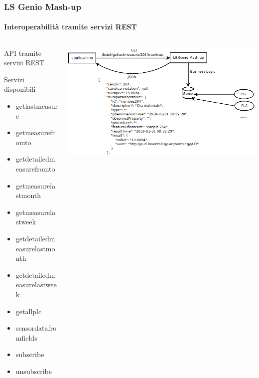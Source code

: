 \documentclass{beamer}
\begin{document}
\begin{frame}
\frametitle{LS Genio Mash-up}
\framesubtitle{Interoperabilità tramite servizi REST}
\begin{columns}[T] %
	\begin{column}{.4\textwidth}
		\begin{itemize}
			{\tiny
				\item API tramite servizi REST
				\item Servizi disponibili
				\begin{itemize}
					\tiny
					\item getlastmeasure
					\item getmeasurefromto
					\item getdetailedmeasurefromto
					\item getmeasurelastmonth
					\item getmeasurelastweek
					\item getdetailedmeasurelastmonth
					\item getdetailedmeasurelastweek
					\item getallplc
					\item sensordatafromfields
					\item subscribe
					\item unsubscribe
				\end{itemize}
			}
		\end{itemize}
		
	\end{column}%
	\hfill%
	\begin{column}{.56\textwidth}
		\includegraphics[width=1\textwidth]{images/interoperabilita-rest.png}
	\end{column}%
\end{columns}
\end{frame}
\end{document}
